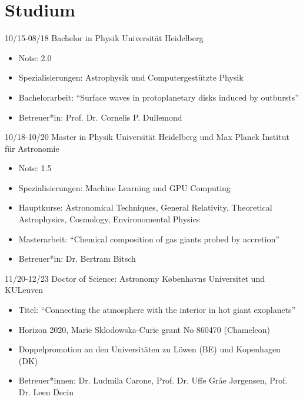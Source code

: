 \documentclass[]{friggeri-cv}
\begin{document}
\section{Studium}
\begin{entrylist}
  \entry
    {10/15-08/18}
    {Bachelor in Physik}
    {Universität Heidelberg}
    {\begin{itemize}\vspace{-3mm}
    	\item Note: 2.0
    	\item Spezialisierungen: Astrophysik und Computergestützte Physik
    	\item Bachelorarbeit: \enquote{Surface waves in protoplanetary disks induced by outbursts}
    	\item Betreuer*in: Prof. Dr. Cornelis P. Dullemond
    \end{itemize}
	}
  \entry
    {10/18-10/20}
    {Master in Physik}
    {Universität Heidelberg und Max Planck Institut für Astronomie}
    {\begin{itemize}\vspace{-3mm}
    	\item Note: 1.5
    	\item Spezialisierungen: Machine Learning und GPU Computing
    	\item Hauptkurse: Astronomical Techniques, General Relativity, Theoretical Astrophysics, Cosmology, Environomental Physics
    	\item Masterarbeit: \enquote{Chemical composition of gas giants probed by accretion}
    	\item Betreuer*in: Dr. Bertram Bitsch
    \end{itemize}
    }
  \entry    
    {11/20-12/23}
    {Doctor of Science: Astronomy}
    {K{\o}benhavns Universitet und KULeuven}
    {\begin{itemize}\vspace{-3mm}
    \item Titel: \enquote{Connecting the atmosphere with the interior in hot giant exoplanets}
    \item Horizon 2020, Marie Sklodowska-Curie grant No 860470 (Chameleon)
    \item Doppelpromotion an den Universitäten zu Löwen (BE) und Kopenhagen (DK)
    \item Betreuer*innen: Dr. Ludmila Carone, Prof. Dr. Uffe Gråe Jørgensen, Prof. Dr. Leen Decin
    \end{itemize}    
	}
	\\
\end{entrylist}
\end{document}
